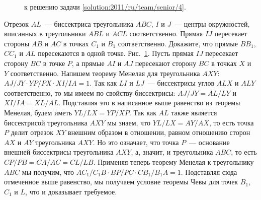 \ifsolution
\begin{figure}\centering
    \caption{к решению задачи \ref{solution:2011/ru/team/senior/4}.}
    \label{fig:solution:2011/ru/team/senior/4}
\end{figure}%
\fi %

\problem{}
Отрезок $AL$~--- биссектриса треугольника $ABC$, $I$ и $J$~--- центры
окружностей, вписанных в треугольники $ABL$ и $ACL$ соответственно.
Прямая $IJ$ пересекает стороны $AB$ и $AC$ в точках $C_1$ и $B_1$
соответственно.
Докажите, что прямые $B B_1$, $C C_1$ и $AL$ пересекаются в одной точке.
\solution
\label{solution:2011/ru/team/senior/4}%
Рис.~\ref{fig:solution:2011/ru/team/senior/4}.
Пусть прямая $IJ$ пересекает сторону $BC$ в точке $P$, а прямые $AI$ и $AJ$
пересекают сторону $BC$ в точках $X$ и $Y$ соответственно.
Напишем теорему Менелая для треугольника $AXY$:
\(
    AJ / JY
    \cdot
    YP / PX
    \cdot
    XI / IA
=
    1
\).
Так как $LI$ и $LJ$~--- биссектрисы углов $ALX$ и $ALY$ соответственно, то мы
имеем по свойству биссектрисы:
$AJ / JY = AL / LY$ и $XI / IA = XL / AL$.
Подставляя это в написанное выше равенство из теоремы Менелая, будем иметь
$YL / LX = YP / XP$.
Так как $AL$ также является биссектрисой треугольника $AXY$ мы знаем, что
$YL / LX = AY / AX$, то есть точка $P$ делит отрезок $XY$ внешним
образом в отношении, равном отношению сторон $AX$ и $AY$ треугольника $AXY$.
Но это означает, что точка $P$~--- основание внешней биссектрисы треугольника
$AXY$, а, значит, и треугольника $ABC$, то есть
$CP / PB = CA / AC = CL / LB$.
Применяя теперь теорему Менелая к треугольнику $ABC$ мы получим, что
\(
    A C_1 / C_1 B
    \cdot
    BP / PC
    \cdot
    C B_1 / B_1 A
=
    1
\).
Подставляя сюда отмеченное выше равенство, мы получаем условие теоремы Чевы для
точек $B_1$, $C_1$ и $L$, что и доказывает требуемое.
\endproblem
